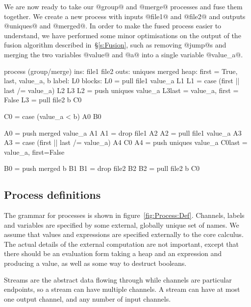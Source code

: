 We are now ready to take our @group@ and @merge@ processes and fuse them together. 
We create a new process with inputs @file1@ and @file2@ and outputs @uniques@ and @merged@.
In order to make the fused process easier to understand, we have performed some minor optimisations on the output of the fusion algorithm described in~\S\ref{s:Fusion}, such as removing @jump@s and merging the two variables @value@ and @a@ into a single variable @value_a@.

\begin{code}
process (group/merge)
     ins: file1 file2
    outs: uniques merged
    heap: {first = True, last, value_a, b}
   label: L0
  blocks: L0 = pull file1   value_a             L1
          L1 = case (first || last /= value_a)  L2    L3
          L2 = push uniques value_a             L3{last = value_a, first = False}
          L3 = pull file2 b                     C0

          C0 = case (value_a < b)               A0    B0

          A0 = push merged  value_a             A1
          A1 = drop file1                       A2
          A2 = pull file1   value_a             A3
          A3 = case (first || last /= value_a)  A4    C0
          A4 = push uniques value_a             C0{last = value_a, first=False}

          B0 = push merged b                    B1
          B1 = drop file2                       B2
          B2 = pull file2  b                    C0
\end{code}


\subsection{Process definitions}


The grammar for processes is shown in figure~\ref{fig:Process:Def}.
Channels, labels and variables are specified by some external, globally unique set of names.
We assume that values and expressions are specified externally to the core calculus.
The actual details of the external computation are not important, except that there should be an evaluation form taking a heap and an expression and producing a value, as well as some way to destruct booleans.

Streams are the abstract data flowing through while channels are particular endpoints, so a stream can have multiple channels.
A stream can have at most one output channel, and any number of input channels.

